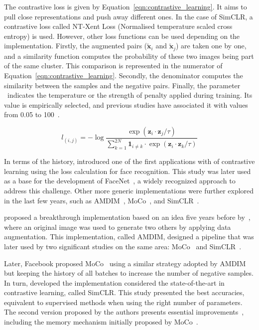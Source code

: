 \documentclass[12pt]{article}
\begin{document}
The contrastive loss is given by Equation~\ref{eqn:contrastive_learning}. It aims to pull close representations and push away different ones. In the case of SimCLR, a contrastive loss called NT-Xent Loss (Normalised temperature scaled cross entropy) is used. However, other loss functions can be used depending on the implementation. Firstly, the augmented pairs ($\tilde{\boldsymbol{x}}_i$ and $\tilde{\boldsymbol{x}}_j$) are taken one by one, and a similarity function computes the probability of these two images being part of the same cluster. This comparison is represented in the numerator of Equation~\ref{eqn:contrastive_learning}. Secondly, the denominator computes the similarity between the samples and the negative pairs. Finally, the parameter \texttau~indicates the temperature or the strength of penalty applied during training. Its value is empirically selected, and previous studies have associated it with values from 0.05 to 100~\citep{chen2020,caron2020}. %

\begin{equation}
l_{(i,j)}=-\log{\frac{\exp{\left(\boldsymbol{z}_i\cdot\boldsymbol{z}_j/\tau\right)}}{\sum_{k=1}^{2N}\mathbf{1}_{i\neq k}\cdot\exp{\left(\boldsymbol{z}_i\cdot\boldsymbol{z}_k/\tau\right)}}}
\label{eqn:contrastive_learning}
\end{equation} 

\vspace{1.5em}

In terms of the history, \citet{chopra2005} introduced one of the first applications with  of contrastive learning using the loss calculation for face recognition. This study was later used as a base for the development of FaceNet~\citep{schroff2015}, a widely recognized approach to address this challenge. Other more generic implementations were further explored in the last few years, such as AMDIM~\citep{bachman2019}, MoCo~\citep{he2020}, and SimCLR~\citep{chen2020}.

\citet{bachman2019} proposed a breakthrough implementation based on an idea five years before by~\citet{dosovitskiy2016}, where an original image was used to generate two others by applying data augmentation. This implementation, called AMDIM, designed a pipeline that was later used by two significant studies on the same area: MoCo~\citep{he2020} and SimCLR~\citep{chen2020}.

Later, Facebook proposed MoCo~\citep{he2020} using a similar strategy adopted by AMDIM but keeping the history of all batches to increase the number of negative samples.
In turn, \citet{chen2020} developed the implementation considered the state-of-the-art in contrastive learning, called SimCLR. This study presented the best accuracies, equivalent to supervised methods when using the right number of parameters. The second version proposed by the authors presents essential improvements~\citep{chen2020.2}, including the memory mechanism initially proposed by MoCo~\citep{he2020}.
\end{document}
